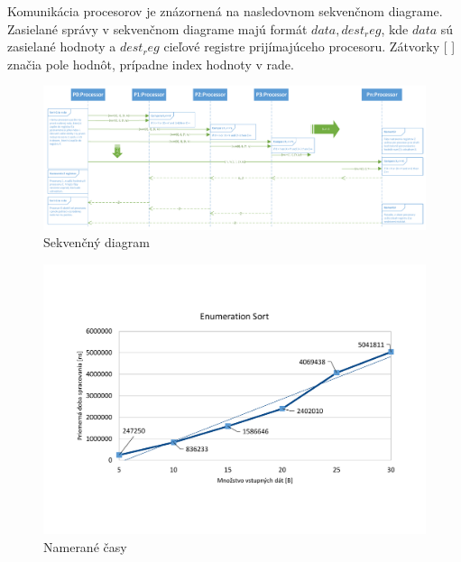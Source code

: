 \documentclass[a4paper,11pt]{article}
\begin{document}
Komunikácia procesorov je znázornená na nasledovnom sekvenčnom diagrame. Zasielané správy v sekvenčnom diagrame majú formát $data, dest_reg$, kde $data$ sú zasielané hodnoty a $dest_reg$ cieľové registre prijímajúceho procesoru. Zátvorky [ ] značia pole hodnôt, prípadne index hodnoty v rade.

\begin{figure}[!htb]
\centering
\includegraphics[width=\textwidth]{sequence.pdf}
\caption{Sekvenčný diagram}
\end{figure}

\begin{figure}[!htb]
\centering
\includegraphics[width=\textwidth]{stats.pdf}
\caption{Namerané časy}
\end{figure}
\end{document}
